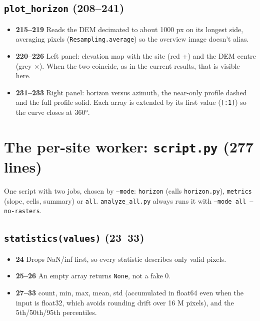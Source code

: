 \documentclass[11pt,a4paper]{article}
\providecommand{\tightlist}{\setlength{\itemsep}{0pt}\setlength{\parskip}{0pt}}
\begin{document}
\hypertarget{plot_horizon-208241}{%
\subsection{\texorpdfstring{\texttt{plot\_horizon}
(208--241)}{plot\_horizon (208--241)}}\label{plot_horizon-208241}}

\begin{itemize}
\tightlist
\item
  \textbf{215--219} Reads the DEM decimated to about 1000 px on its
  longest side, averaging pixels
  (\texttt{Resampling.average}) so the overview image
  doesn't alias.
\item
  \textbf{220--226} Left panel: elevation map with the site (red +) and
  the DEM centre (grey ×). When the two coincide, as in the current
  results, that is visible here.
\item
  \textbf{231--233} Right panel: horizon versus azimuth, the near-only
  profile dashed and the full profile solid. Each array is extended by
  its first value (\texttt{[:1]}) so the curve closes
  at 360°.
\end{itemize}

\hypertarget{the-per-site-worker-script.py-277-lines}{%
\section{\texorpdfstring{The per-site worker: \texttt{script.py} (277
lines)}{The per-site worker: script.py (277 lines)}}\label{the-per-site-worker-script.py-277-lines}}

One script with two jobs, chosen by \texttt{--mode}:
\texttt{horizon} (calls
\texttt{horizon.py}), \texttt{metrics}
(slope, cells, summary) or \texttt{all}.
\texttt{analyze\_all.py} always runs it with
\texttt{--mode all --no-rasters}.

\hypertarget{statisticsvalues-2333}{%
\subsection{\texorpdfstring{\texttt{statistics(values)}
(23--33)}{statistics(values) (23--33)}}\label{statisticsvalues-2333}}

\begin{itemize}
\tightlist
\item
  \textbf{24} Drops NaN/inf first, so every statistic describes only
  valid pixels.
\item
  \textbf{25--26} An empty array returns \texttt{None},
  not a fake 0.
\item
  \textbf{27--33} count, min, max, mean, std (accumulated in float64
  even when the input is float32, which avoids rounding drift over 16 M
  pixels), and the 5th/50th/95th percentiles.
\end{itemize}
\end{document}
